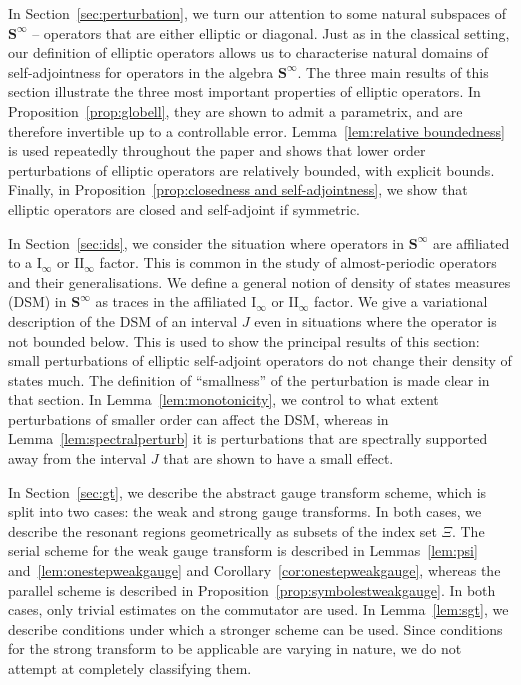 \documentclass[AHL,Unicode,longabstracts,published]{cedram}
\newcommand{\rmI}{\mathrm{I}}
\newcommand{\rmII}{\mathrm{II}}
\newcommand{\BS}{\mathbf S}
\begin{document}
In Section~\ref{sec:perturbation}, we turn our attention to some natural subspaces of $\BS^\infty$ -- operators that are either elliptic or diagonal. Just as in the classical setting, our definition of elliptic operators allows us to characterise natural domains of self-adjointness for operators in the algebra $\BS^\infty$. The three main results of this section illustrate the three most important properties of elliptic operators. In Proposition~\ref{prop:globell}, they are shown to admit a parametrix, and are therefore invertible up to a controllable error. Lemma~\ref{lem:relative boundedness} is used repeatedly throughout the paper and shows that lower order perturbations of elliptic operators are relatively bounded, with explicit bounds. Finally, in Proposition~\ref{prop:closedness and self-adjointness}, we show that elliptic operators are closed and self-adjoint if symmetric.

In Section~\ref{sec:ids}, we consider the situation where operators in $\BS^\infty$ are affiliated to a $\rmI_\infty$ or $\rmII_\infty$ factor. This is common in the study of almost-periodic operators and their generalisations. We define a general notion of density of states measures (DSM) in $\BS^\infty$ as traces in the affiliated $\rmI_\infty$ or $\rmII_\infty$ factor. We give a variational description of the DSM of an interval $J$ even in situations where the operator is not bounded below. This is used to show the principal results of this section: small perturbations of elliptic self-adjoint operators do not change their density of states much. The definition of ``smallness'' of the perturbation is made clear in that section. In Lemma~\ref{lem:monotonicity}, we control to what extent perturbations of smaller order can affect the DSM, whereas in Lemma~\ref{lem:spectralperturb} it is perturbations that are spectrally supported away from the interval $J$ that are shown to have a small effect.

In Section~\ref{sec:gt}, we describe the abstract gauge transform scheme, which is split into two cases: the weak and strong gauge transforms. In both cases, we describe the resonant regions geometrically as subsets of the index set $\Xi$. The serial scheme for the weak gauge transform is described in Lemmas~\ref{lem:psi} and~\ref{lem:onestepweakgauge} and Corollary~\ref{cor:onestepweakgauge}, whereas the parallel scheme is described in Proposition~\ref{prop:symbolestweakgauge}. In both cases, only trivial estimates on the commutator are used. In Lemma~\ref{lem:sgt}, we describe conditions under which a stronger scheme can be used. Since conditions for the strong transform to be applicable are varying in nature, we do not attempt at completely classifying them.
\end{document}
